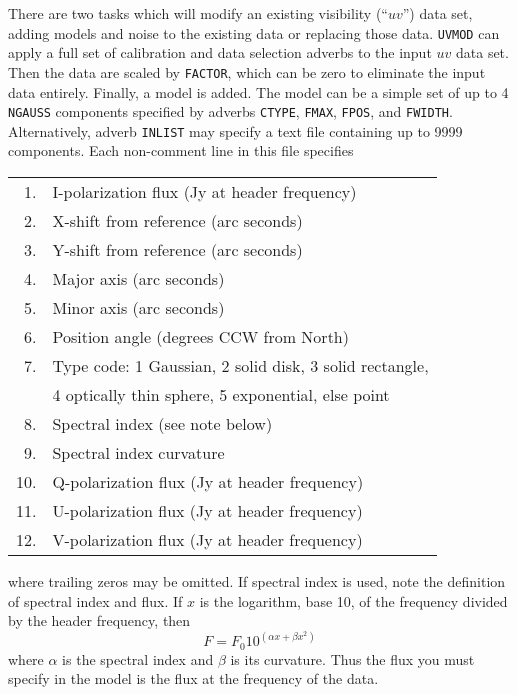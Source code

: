 \documentclass[twoside]{article}
\newcommand{\Hi}[1]{\textcolor{hicol}{#1}}
\begin{document}
There are two tasks which will modify an existing visibility (``$uv$'')
data set, adding models and noise to the existing data or replacing
those data.  {\tt UVMOD} can apply a full set of calibration and data
selection adverbs to the input $uv$ data set.  Then the data are
scaled by {\tt FACTOR}, which can be zero to eliminate the input data
entirely.  Finally, a model is added.  The model can be a simple set
of up to 4 {\tt NGAUSS} components specified by adverbs {\tt CTYPE},
{\tt FMAX}, {\tt FPOS}, and {\tt FWIDTH}\@.  Alternatively, adverb
{\tt INLIST} may specify a text file containing up to 9999 components.
Each non-comment line in this file specifies
\begin{center}
\begin{tabular}{|r|l|}\hline
 1. & I-polarization flux (Jy at \Hi{header frequency})\\
 2. & X-shift from reference (arc seconds)\\
 3. & Y-shift from reference (arc seconds)\\
 4. & Major axis (arc seconds)\\
 5. & Minor axis (arc seconds)\\
 6. & Position angle (degrees CCW from North)\\
 7. & Type code: 1 Gaussian, 2 solid disk, 3 solid rectangle,\\
    & 4 optically thin sphere, 5 exponential, else point\\
 8. & Spectral index (see note below)\\
 9. & Spectral index curvature\\
10. & Q-polarization flux (Jy at \Hi{header frequency})\\
11. & U-polarization flux (Jy at \Hi{header frequency})\\
12. & V-polarization flux (Jy at \Hi{header frequency}) \\ \hline
\end{tabular}
\end{center}
where trailing zeros may be omitted.  If spectral index is used, note
the definition of spectral index and flux.  If $x$ is the logarithm,
base 10, of the frequency \Hi{divided by the header frequency}, then
$$ F = F_0 10^{(\alpha x + \beta x^2)} $$
where $\alpha$ is the spectral index and $\beta$ is its curvature.
Thus the flux you must specify in the model is \Hi{the flux at the
frequency of the data}.
\end{document}
